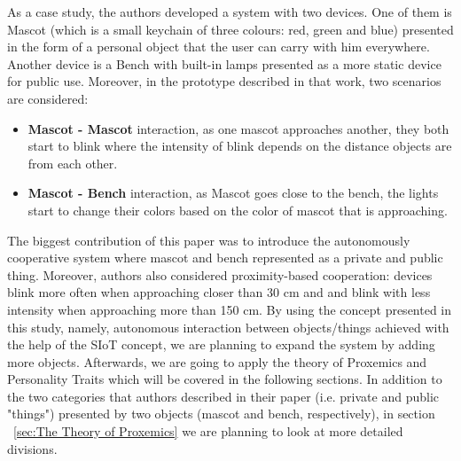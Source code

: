 \par As a case study, the authors developed a system with two devices. One of them is Mascot (which is a small keychain of three colours: red, green and blue) presented in the form of a personal object that the user can carry with him everywhere. Another device is a Bench with built-in lamps presented as a more static device for public use. Moreover, in the prototype described in that work, two scenarios are considered:
\begin{itemize}
  \item \textbf{Mascot - Mascot} interaction, as one mascot approaches another, they both start to blink where the intensity of blink depends on the distance objects are from each other.
  \item \textbf{Mascot - Bench} interaction, as Mascot goes close to the bench, the lights start to change their colors based on the color of mascot that is approaching.
\end{itemize}
The biggest contribution of this paper was to introduce the autonomously cooperative system where mascot and bench represented as a private and public thing. Moreover, authors also considered proximity-based cooperation: devices blink more often when approaching closer than 30 cm and and blink with less intensity when approaching more than 150 cm. By using the concept presented in this study, namely, autonomous interaction between objects/things achieved with the help of the SIoT concept, we are planning to expand the system by adding more objects. Afterwards, we are going to apply the theory of Proxemics and Personality Traits which will be covered in the following sections. In addition to the two categories that authors described in their paper (i.e. private and public "things") presented by two objects (mascot and bench, respectively), in section ~\ref{sec:The Theory of Proxemics} we are planning to look at more detailed divisions.


